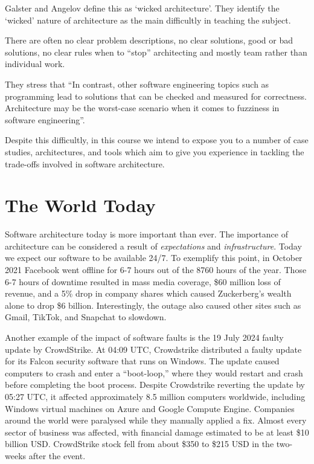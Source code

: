 Galster and Angelov \cite{wicked-architecture} define this as `wicked architecture'.
They identify the `wicked' nature of architecture as the main difficultly in teaching the subject.

\begin{definition}
There are often no clear problem descriptions, no clear solutions, good or bad solutions, no clear rules when to ``stop'' architecting
and mostly team rather than individual work.
\end{definition}

They stress that ``In contrast, other software engineering topics such as programming lead to solutions that can be checked and measured for correctness.
Architecture may be the worst-case scenario when it comes to fuzziness in software engineering''.

Despite this difficultly, in this course we intend to expose you to a number of case studies, architectures,
and tools which aim to give you experience in tackling the trade-offs involved in software architecture.

\section{The World Today}
Software architecture today is more important than ever.
The importance of architecture can be considered a result of \textsl{expectations} and \textsl{infrastructure}.
Today we expect our software to be available 24/7.
To exemplify this point, in October 2021 Facebook went offline for 6-7 hours out of the 8760 hours of the year.
Those 6-7 hours of downtime resulted in mass media coverage, \$60 million loss of revenue,
and a 5\% drop in company shares which caused Zuckerberg's wealth alone to drop \$6 billion.
Interestingly, the outage also caused other sites such as Gmail, TikTok, and Snapchat to slowdown.

Another example of the impact of software faults is the 19 July 2024 faulty update by CrowdStrike.
At 04:09 UTC, Crowdstrike distributed a faulty update for its Falcon security software that runs on Windows.
The update caused computers to crash and enter a ``boot-loop,''
where they would restart and crash before completing the boot process.
Despite Crowdstrike reverting the update by 05:27 UTC,
it affected approximately 8.5 million computers worldwide,
including Windows virtual machines on Azure and Google Compute Engine.
Companies around the world were paralysed while they manually applied a fix.
Almost every sector of business was affected,
with financial damage estimated to be at least \$10 billion USD.
CrowdStrike stock fell from about \$350 to \$215 USD in the two-weeks after the event.

